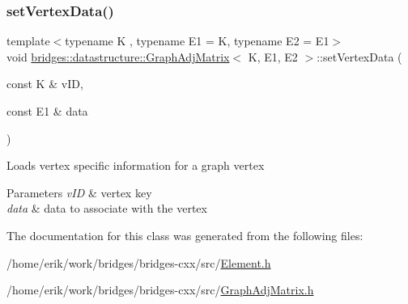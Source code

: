 \subsubsection{\texorpdfstring{set\+Vertex\+Data()}{setVertexData()}}
{\footnotesize\ttfamily template$<$typename K , typename E1  = K, typename E2  = E1$>$ \\
void \hyperlink{classbridges_1_1datastructure_1_1_graph_adj_matrix}{bridges\+::datastructure\+::\+Graph\+Adj\+Matrix}$<$ K, E1, E2 $>$\+::set\+Vertex\+Data (\begin{DoxyParamCaption}\item[{const K \&}]{v\+ID,  }\item[{const E1 \&}]{data }\end{DoxyParamCaption})\hspace{0.3cm}{\ttfamily [inline]}}

Loads vertex specific information for a graph vertex


\begin{DoxyParams}{Parameters}
{\em v\+ID} & vertex key \\
\hline
{\em data} & data to associate with the vertex \\
\hline
\end{DoxyParams}


The documentation for this class was generated from the following files\+:\begin{DoxyCompactItemize}
\item 
/home/erik/work/bridges/bridges-\/cxx/src/\hyperlink{_element_8h}{Element.\+h}\item 
/home/erik/work/bridges/bridges-\/cxx/src/\hyperlink{_graph_adj_matrix_8h}{Graph\+Adj\+Matrix.\+h}\end{DoxyCompactItemize}
